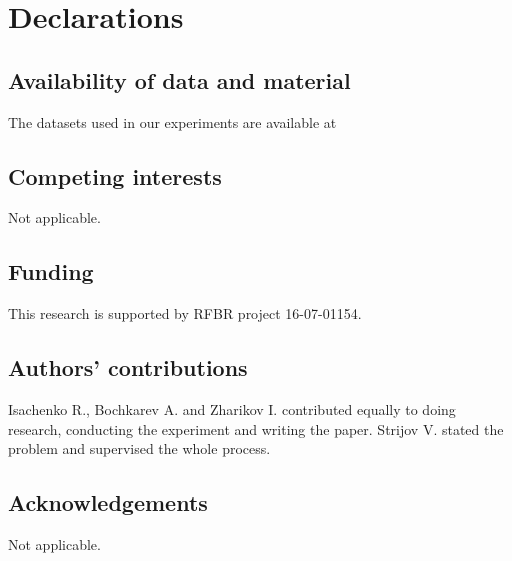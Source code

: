 \documentclass{llncs}
\begin{document}
\section{Declarations}
\subsection{Availability of data and material}
The datasets used in our experiments are available at \cite{usc,wisdm}
\subsection{Competing interests}
Not applicable.
\subsection{Funding}
This research is supported by RFBR project 16-07-01154.
\subsection{Authors' contributions}
Isachenko R., Bochkarev A. and Zharikov I. contributed equally to doing research, conducting the experiment and writing the paper. Strijov V. stated the problem and supervised the whole process.
\subsection{Acknowledgements}
Not applicable.

\end{document}
